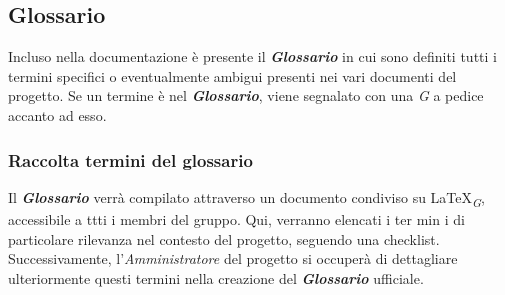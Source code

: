 \subsection{Glossario}
Incluso nella documentazione è presente il \textbf{\textit{Glossario}} in cui sono definiti tutti i termini specifici o eventualmente ambigui presenti nei vari documenti del progetto. Se un termine è nel \textbf{\textit{Glossario}}, viene segnalato con una \textit{G} a pedice accanto ad esso.

\subsubsection{Raccolta termini del glossario}
Il \textbf{\textit{Glossario}} verrà compilato attraverso un documento condiviso su \LaTeX \textsubscript{\textit{G}}, accessibile a ttti i membri del gruppo. Qui, verranno elencati i ter min  i di particolare rilevanza nel contesto del progetto, seguendo una checklist.   Successivamente, l'\textit{Amministratore} del progetto si occuperà di dettagliare  ulteriormente questi termini nella creazione del \textbf{\textit{Glossario}} ufficiale. 